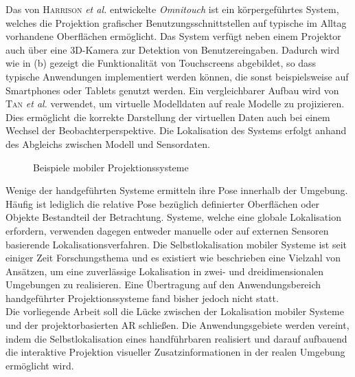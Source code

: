 Das von \textsc{Harrison} \textit{et al.} \cite{Harrison2011} entwickelte \textit{Omnitouch} ist ein körpergeführtes System, welches die Projektion grafischer Benutzungsschnittstellen auf typische im Alltag vorhandene Oberflächen ermöglicht. Das System verfügt neben einem Projektor auch über eine 3D-Kamera zur Detektion von Benutzereingaben. Dadurch wird wie in  (b) gezeigt die Funktionalität von Touchscreens abgebildet, so dass typische Anwendungen implementiert werden können, die sonst beispielsweise auf Smartphones oder Tablets genutzt werden. Ein vergleichbarer Aufbau wird von \textsc{Tan} \textit{et al.} \cite{Tan2013} verwendet, um virtuelle Modelldaten auf reale Modelle zu projizieren. Dies ermöglicht die korrekte Darstellung der virtuellen Daten auch bei einem Wechsel der Beobachterperspektive. Die Lokalisation des Systems erfolgt anhand des Abgleichs zwischen Modell und Sensordaten.\\

\begin{figure}[!ht]
	\begin{center}
	\caption{Beispiele mobiler Projektionssysteme}
	\label{fig.projsystems}
	\end{center}
\end{figure}

\prever{
}

Wenige der handgeführten Systeme ermitteln ihre Pose innerhalb der Umgebung. Häufig ist lediglich die relative Pose bezüglich definierter Oberflächen oder Objekte Bestandteil der Betrachtung. Systeme, welche eine globale Lokalisation erfordern, verwenden dagegen entweder manuelle oder auf externen Sensoren basierende Lokalisationsverfahren. Die Selbstlokalisation mobiler Systeme ist seit einiger Zeit Forschungsthema und es existiert wie beschrieben eine Vielzahl von Ansätzen, um eine zuverlässige Lokalisation in zwei- und dreidimensionalen Umgebungen zu realisieren. Eine Übertragung auf den Anwendungsbereich handgeführter Projektionssysteme fand bisher jedoch nicht statt.\\

Die vorliegende Arbeit soll die Lücke zwischen der Lokalisation mobiler Systeme und der projektorbasierten AR schließen. Die Anwendungsgebiete werden vereint, indem die Selbstlokalisation eines handführbaren  realisiert und darauf aufbauend die interaktive Projektion visueller Zusatzinformationen in der realen Umgebung ermöglicht wird.\\

